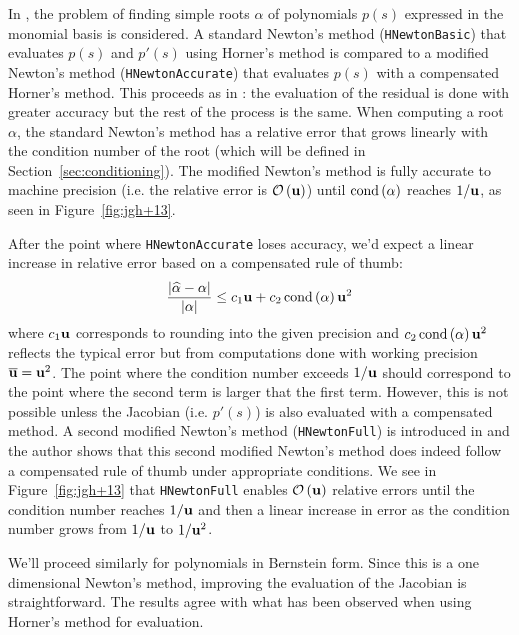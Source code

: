 In \cite{Graillat2008}, the problem of finding simple roots \(\alpha\) of
polynomials \(p(s)\) expressed in the monomial basis is considered.
A standard Newton's method (\texttt{HNewtonBasic}) that evaluates \(p(s)\)
and \(p'(s)\) using Horner's method is compared to a modified Newton's method
(\texttt{HNewtonAccurate}) that evaluates \(p(s)\) with a compensated
Horner's method. This proceeds as in \cite{Tisseur2001}: the evaluation of
the residual is done with greater accuracy but the rest of the process
is the same. When computing a root \(\alpha\), the standard Newton's method
has a relative error that grows linearly with the condition number of the
root (which will be defined in Section~\ref{sec:conditioning}). The
modified Newton's method is fully accurate to machine precision (i.e.
the relative error is \(\mathcal{O}\left(\mathbf{u}\right)\)) until \(\operatorname{cond}\left(\alpha\right)\) reaches
\(1/\mathbf{u}\), as seen in Figure~\ref{fig:jgh+13}.

After the point where \texttt{HNewtonAccurate} loses accuracy, we'd
expect a linear increase in relative error based on a compensated
rule of thumb:
\begin{equation}\label{eq:comp-rule-thumb}
\frac{\left|\widehat{\alpha} - \alpha\right|}{\left|\alpha\right|} \leq
  c_1 \mathbf{u} + c_2 \operatorname{cond}\left(\alpha\right) \mathbf{u}^2
\end{equation}
where \(c_1 \mathbf{u}\) corresponds to rounding into the given
precision and \(c_2 \operatorname{cond}\left(\alpha\right) \mathbf{u}^2\) reflects the
typical error but from computations done with working precision
\(\overline{\mathbf{u}} = \mathbf{u}^2\). The point
where the condition number exceeds \(1/\mathbf{u}\) should correspond to
the point where the second term is larger that the
first term. However, this is not possible unless the
Jacobian (i.e. \(p'(s)\)) is also evaluated with a compensated
method. A second modified Newton's method (\texttt{HNewtonFull}) is
introduced in \cite[Section~8]{Jiang2013} and the author shows that
this second modified Newton's method does indeed follow a compensated
rule of thumb under appropriate conditions. We see in
Figure~\ref{fig:jgh+13} that \texttt{HNewtonFull} enables
\(\mathcal{O}\left(\mathbf{u}\right)\) relative errors until the condition number reaches
\(1/\mathbf{u}\) and then a linear increase in error as the condition number
grows from \(1/\mathbf{u}\) to \(1/\mathbf{u}^2\).

We'll proceed similarly for polynomials in
Bernstein form. Since this is a one dimensional Newton's method, improving
the evaluation of the Jacobian is straightforward. The results agree with
what has been observed when using Horner's method for evaluation.

